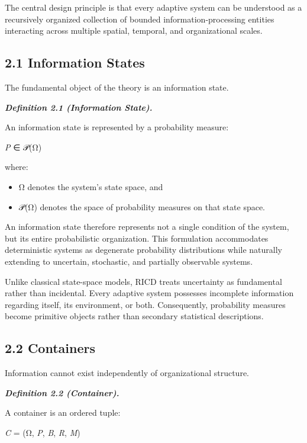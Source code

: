 \documentclass[
]{article}
\begin{document}
The central design principle is that every adaptive system can be
understood as a recursively organized collection of bounded
information-processing entities interacting across multiple spatial,
temporal, and organizational scales.

\hypertarget{information-states}{%
\subsection{2.1 Information States}\label{information-states}}

The fundamental object of the theory is an information state.

\emph{\textbf{Definition 2.1 (Information State).}}

An information state is represented by a probability measure:

\emph{P} ∈ 𝒫(Ω)

where:

\begin{itemize}
\item
  Ω denotes the system's state space, and
\item
  𝒫(Ω) denotes the space of probability measures on that state space.
\end{itemize}

An information state therefore represents not a single condition of the
system, but its entire probabilistic organization. This formulation
accommodates deterministic systems as degenerate probability
distributions while naturally extending to uncertain, stochastic, and
partially observable systems.

Unlike classical state-space models, RICD treats uncertainty as
fundamental rather than incidental. Every adaptive system possesses
incomplete information regarding itself, its environment, or both.
Consequently, probability measures become primitive objects rather than
secondary statistical descriptions.

\hypertarget{containers}{%
\subsection{2.2 Containers}\label{containers}}

Information cannot exist independently of organizational structure.

\emph{\textbf{Definition 2.2 (Container).}}

A container is an ordered tuple:

\emph{C} = (Ω, \emph{P}, \emph{B}, \emph{R}, \emph{M})
\end{document}

